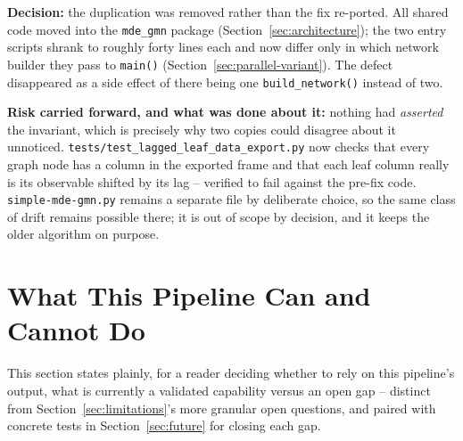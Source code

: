 \documentclass[11pt]{article}
\begin{document}
\textbf{Decision:} the duplication was removed rather than the fix re-ported. All shared code moved into the \texttt{mde\_gmn} package (Section~\ref{sec:architecture}); the two entry scripts shrank to roughly forty lines each and now differ only in which network builder they pass to \texttt{main()} (Section~\ref{sec:parallel-variant}). The defect disappeared as a side effect of there being one \texttt{build\_network()} instead of two.

\textbf{Risk carried forward, and what was done about it:} nothing had \emph{asserted} the invariant, which is precisely why two copies could disagree about it unnoticed. \texttt{tests/test\_lagged\_leaf\_data\_export.py} now checks that every graph node has a column in the exported frame and that each leaf column really is its observable shifted by its lag -- verified to fail against the pre-fix code. \texttt{simple-mde-gmn.py} remains a separate file by deliberate choice, so the same class of drift remains possible there; it is out of scope by decision, and it keeps the older algorithm on purpose.

\newpage
\section{What This Pipeline Can and Cannot Do}
\label{sec:capabilities}
This section states plainly, for a reader deciding whether to rely on this pipeline's output, what is currently a validated capability versus an open gap -- distinct from Section~\ref{sec:limitations}'s more granular open questions, and paired with concrete tests in Section~\ref{sec:future} for closing each gap.
\end{document}
